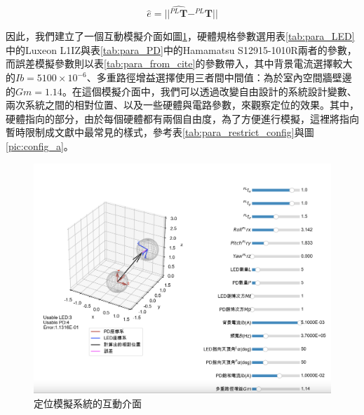 \begin{equation}
    \label{eqn:error_dis}
    \hat{e} = ||\hat{^{PL}\boldsymbol{T}}-^{PL}\boldsymbol{T}||
\end{equation}





因此，我們建立了一個互動模擬介面如圖\ref{pic:result_interactive}，硬體規格參數選用表\ref{tab:para_LED}中的Luxeon L1IZ與表\ref{tab:para_PD}中的Hamamatsu S12915-1010R兩者的參數，而誤差模擬參數則以表\ref{tab:para_from_cite}的參數帶入，其中背景電流選擇較大的$Ib = 5100\times 10^{-6}$、多重路徑增益選擇使用三者間中間值：為於室內空間牆壁邊的$Gm=1.14$。在這個模擬介面中，我們可以透過改變自由設計的系統設計變數、兩次系統之間的相對位置、以及一些硬體與電路參數，來觀察定位的效果。其中，硬體指向的部分，由於每個硬體都有兩個自由度，為了方便進行模擬，這裡將指向暫時限制成文獻中最常見的樣式，參考表\ref{tab:para_restrict_config}與圖\ref{pic:config_a}。



\begin{figure}[htpb]
    \centering
    \includegraphics[width=15cm]{ch4pic/interactive_1to1.png}
    \caption{定位模擬系統的互動介面}
    \label{pic:result_interactive}
\end{figure}



